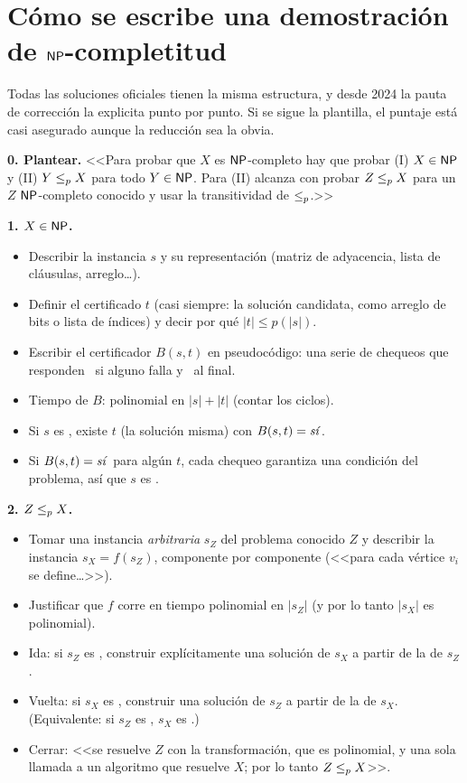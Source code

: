 \section{Cómo se escribe una demostración de \texorpdfstring{$\NP$}{NP}-completitud}

Todas las soluciones oficiales tienen la misma estructura, y desde 2024 la pauta de corrección la explicita punto por punto. Si se sigue la plantilla, el puntaje está casi asegurado aunque la reducción sea la obvia.

\begin{receta}
\textbf{0. Plantear.} <<Para probar que $X$ es $\NP$-completo hay que probar (I) $X\in\NP$ y (II) $Y\redp X$ para todo $Y\in\NP$. Para (II) alcanza con probar $Z\redp X$ para un $Z$ $\NP$-completo conocido y usar la transitividad de $\redp$.>>

\textbf{1. $X\in\NP$.}
\begin{itemize}
  \item Describir la instancia $s$ y su representación (matriz de adyacencia, lista de cláusulas, arreglo\dots).
  \item Definir el certificado $t$ (casi siempre: la solución candidata, como arreglo de bits o lista de índices) y decir por qué $|t|\le p(|s|)$.
  \item Escribir el certificador $B(s,t)$ en pseudocódigo: una serie de chequeos que responden \npno\ si alguno falla y \npsi\ al final.
  \item Tiempo de $B$: polinomial en $|s|+|t|$ (contar los ciclos).
  \item Si $s$ es \npsi, existe $t$ (la solución misma) con $B(s,t)=\text{\npsi}$.
  \item Si $B(s,t)=\text{\npsi}$ para algún $t$, cada chequeo garantiza una condición del problema, así que $s$ es \npsi.
\end{itemize}

\textbf{2. $Z\redp X$.}
\begin{itemize}
  \item Tomar una instancia \emph{arbitraria} $s_Z$ del problema conocido $Z$ y describir la instancia $s_X=f(s_Z)$, componente por componente (<<para cada vértice $v_i$ se define\dots>>).
  \item Justificar que $f$ corre en tiempo polinomial en $|s_Z|$ (y por lo tanto $|s_X|$ es polinomial).
  \item Ida: si $s_Z$ es \npsi, construir explícitamente una solución de $s_X$ a partir de la de $s_Z$.
  \item Vuelta: si $s_X$ es \npsi, construir una solución de $s_Z$ a partir de la de $s_X$. (Equivalente: si $s_Z$ es \npno, $s_X$ es \npno.)
  \item Cerrar: <<se resuelve $Z$ con la transformación, que es polinomial, y una sola llamada a un algoritmo que resuelve $X$; por lo tanto $Z\redp X$>>.
\end{itemize}


\end{receta}
